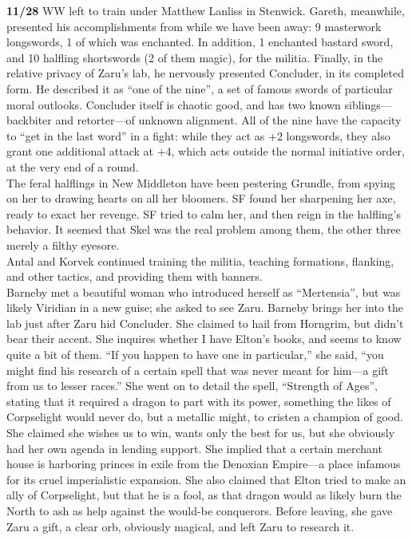 \documentclass[letterpaper]{article}
\begin{document}
\noindent\textbf{11/28} WW left to train under Matthew Lanliss in Stenwick.   Gareth, meanwhile, presented his accomplishments from while we have been away: 9 masterwork longswords, 1 of which was enchanted. In addition, 1 enchanted bastard sword, and 10 halfling shortswords (2 of them magic), for the militia. Finally, in the relative privacy of Zaru's lab, he nervously presented Concluder, in its completed form.  He described it as ``one of the nine'', a set of famous swords of particular moral outlooks.  Concluder itself is chaotic good, and has two known siblings---backbiter and retorter---of unknown alignment.  All of the nine have the capacity to ``get in the last word'' in a fight: while they act as +2 longswords, they also grant one additional attack at +4, which acts outside the normal initiative order, at the very end of a round.\\

\noindent The feral halflings in New Middleton have been pestering Grundle, from spying on her to drawing hearts on all her bloomers. SF found her sharpening her axe, ready to exact her revenge.  SF tried to calm her, and then reign in the halfling's behavior.  It seemed that Skel was the real problem among them, the other three merely a filthy eyesore.  \\

\noindent Antal and Korvek continued training the militia, teaching formations, flanking, and other tactics, and providing them with banners.\\

\noindent Barneby met a beautiful woman who introduced herself as ``Mertensia'', but was likely Viridian in a new guise; she asked to see Zaru. Barneby brings her into the lab just after Zaru hid Concluder.  She claimed to hail from Horngrim, but didn't bear their accent.  She inquires whether I have Elton's books, and seems to know quite a bit of them.  ``If you happen to have one in particular,'' she said, ``you might find his research of a certain spell that was never meant for him---a gift from us to lesser races.'' She went on to detail the spell, ``Strength of Ages'', stating that it required a dragon to part with its power, something the likes of Corpselight would never do, but a metallic might, to cristen a champion of good.  She claimed she wishes us to win, wants only the best for us, but she obviously had her own agenda in lending support.  She implied that a certain merchant house is harboring princes in exile from the Denoxian Empire---a place infamous for its cruel imperialistic expansion.  She also claimed that Elton tried to make an ally of Corpselight, but that he is a fool, as that dragon would as likely burn the North to ash as help against the would-be conquerors. Before leaving, she gave Zaru a gift, a clear orb, obviously magical, and left Zaru to research it.\\
\end{document}
